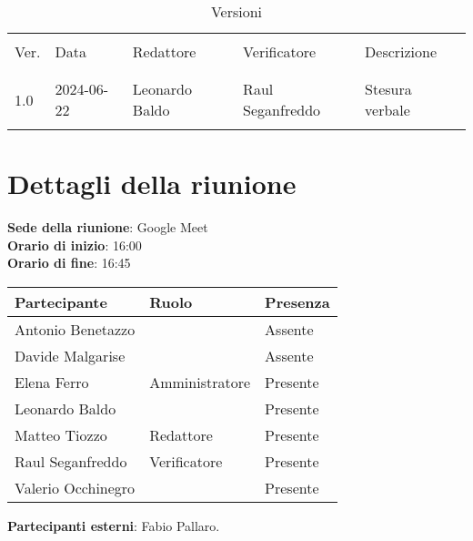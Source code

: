 \documentclass[italian,12pt]{article}
\begin{document}


\newpage



\begin{table}[!h]
	\caption{Versioni}
	\footnotesize
	\begin{center}
		\begin{tabular}{ l l l l p{6cm} }
			\hline                                                                     \\[-2ex]
			Ver. & Data       & Redattore        & Verificatore      & Descrizione     \\
			\\[-2ex] \hline \\[-1.5ex]
			1.0  & 2024-06-22 & Leonardo Baldo   & Raul Seganfreddo  & Stesura verbale \\
			\\[-1.5ex] \hline
		\end{tabular}
	\end{center}
\end{table}

\newpage

\tableofcontents

\newpage

\section{Dettagli della riunione}

\textbf{Sede della riunione}: Google Meet\\
\textbf{Orario di inizio}: 16:00\\
\textbf{Orario di fine}: 16:45\\

\begin{flushleft}
	\begin{table}[!h]
		\begin{tabular}{ |l|l|l| }
			\hline
			\textbf{Partecipante} & \textbf{Ruolo} & \textbf{Presenza} \\
			\hline
			Antonio Benetazzo     &                 & Assente           \\
			Davide Malgarise      &                 & Assente           \\
			Elena Ferro           & Amministratore  & Presente          \\
			Leonardo Baldo        &                 & Presente          \\
			Matteo Tiozzo         & Redattore       & Presente          \\
			Raul Seganfreddo      & Verificatore    & Presente          \\
			Valerio Occhinegro    & 				& Presente          \\
			\hline
		\end{tabular}
	\end{table}
	\textbf{Partecipanti esterni}: Fabio Pallaro.\\
\end{flushleft}
\end{document}
